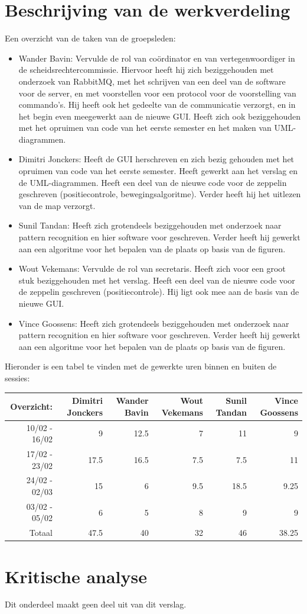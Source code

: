 \documentclass[tt]{penoverslag}
\begin{document}
\section{Beschrijving van de werkverdeling}
Een overzicht van de taken van de groepsleden: \\
\begin{itemize}
\item Wander Bavin: Vervulde de rol van co\"ordinator en van vertegenwoordiger in de scheidsrechtercommissie. Hiervoor heeft hij zich beziggehouden met onderzoek van RabbitMQ, met het schrijven van een deel van de software voor de server, en met voorstellen voor een protocol voor de voorstelling van commando's. Hij heeft ook het gedeelte van de communicatie verzorgt, en in het begin even meegewerkt aan de nieuwe GUI. Heeft zich ook beziggehouden met het opruimen van code van het eerste semester en het maken van UML-diagrammen.
\item Dimitri Jonckers: Heeft de GUI herschreven en zich bezig gehouden met het opruimen van code van het eerste semester. Heeft gewerkt aan het verslag en de UML-diagrammen. Heeft een deel van de nieuwe code voor de zeppelin geschreven (positiecontrole, bewegingsalgoritme). Verder heeft hij het uitlezen van de map verzorgt.
\item Sunil Tandan: Heeft zich grotendeels beziggehouden met onderzoek naar pattern recognition en hier software voor geschreven. Verder heeft hij gewerkt aan een algoritme voor het bepalen van de plaats op basis van de figuren.
\item Wout Vekemans: Vervulde de rol van secretaris. Heeft zich voor een groot stuk beziggehouden met het verslag. Heeft een deel van de nieuwe code voor de zeppelin geschreven (positiecontrole). Hij ligt ook mee aan de basis van de nieuwe GUI. 
\item Vince Goossens: Heeft zich grotendeels beziggehouden met onderzoek naar pattern recognition en hier software voor geschreven. Verder heeft hij gewerkt aan een algoritme voor het bepalen van de plaats op basis van de figuren.
\end{itemize}

Hieronder is een tabel te vinden met de gewerkte uren binnen en buiten de sessies: \\

\begin{tabular}{r||r|r|r|r|r}
Overzicht: & Dimitri Jonckers & Wander Bavin & Wout Vekemans & Sunil Tandan & Vince Goossens \\
\hline \hline
10/02 - 16/02 & 9 & 12.5 & 7 & 11 & 9 \\
17/02 - 23/02 & 17.5 & 16.5 & 7.5 & 7.5 & 11 \\
24/02 - 02/03 & 15 & 6 & 9.5 & 18.5 & 9.25 \\
03/02 - 05/02 & 6 & 5 & 8 & 9 & 9 \\
\hline \hline
Totaal & 47.5 & 40 & 32 & 46 & 38.25 \\
\end{tabular}


\section{Kritische analyse}
Dit onderdeel maakt geen deel uit van dit verslag.
\end{document}
